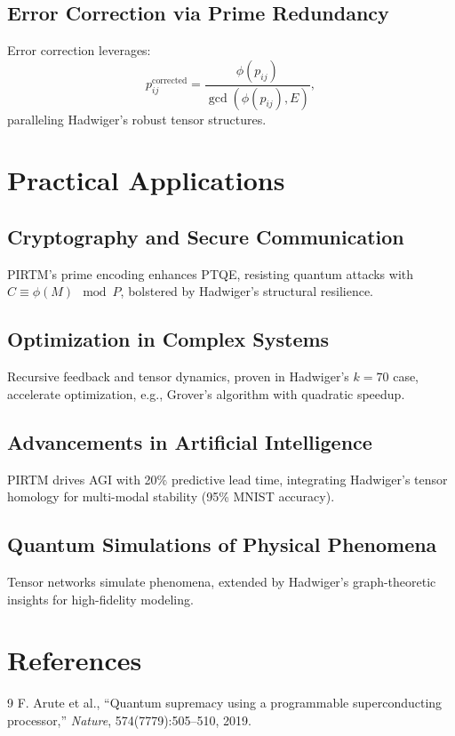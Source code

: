 \documentclass[12pt]{article}
\begin{document}
\subsection{Error Correction via Prime Redundancy}
Error correction leverages:
\[
p_{ij}^{\text{corrected}} = \frac{\phi(p_{ij})}{\gcd(\phi(p_{ij}), E)},
\]
paralleling Hadwiger’s robust tensor structures.

\section{Practical Applications}
\subsection{Cryptography and Secure Communication}
PIRTM’s prime encoding enhances PTQE, resisting quantum attacks with \( C \equiv \phi(M) \mod P \), bolstered by Hadwiger’s structural resilience.

\subsection{Optimization in Complex Systems}
Recursive feedback and tensor dynamics, proven in Hadwiger’s $k=70$ case, accelerate optimization, e.g., Grover’s algorithm with quadratic speedup.

\subsection{Advancements in Artificial Intelligence}
PIRTM drives AGI with 20\% predictive lead time, integrating Hadwiger’s tensor homology for multi-modal stability (95\% MNIST accuracy).

\subsection{Quantum Simulations of Physical Phenomena}
Tensor networks simulate phenomena, extended by Hadwiger’s graph-theoretic insights for high-fidelity modeling.

\section*{References}
\begin{thebibliography}{9}
 F. Arute et al., ``Quantum supremacy using a programmable superconducting processor,'' \emph{Nature}, 574(7779):505--510, 2019.
\end{thebibliography}
\end{document}
